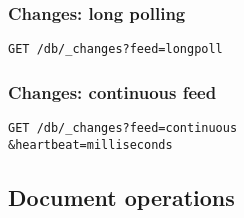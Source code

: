\begin{multicols}{2}
\subsubsection{Changes: long polling}
\begin{lstlisting}
GET /db/_changes?feed=longpoll
\end{lstlisting}

\subsubsection{Changes: continuous feed}
\begin{lstlisting}
GET /db/_changes?feed=continuous 
&heartbeat=milliseconds
\end{lstlisting}

\end{multicols}

\subsection{Document operations}

